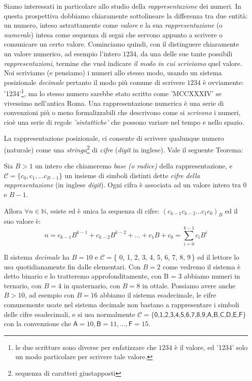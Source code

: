 Siamo interessati in particolare allo studio della \emph{rappresentazione} dei
numeri. In questa prospettiva dobbiamo chiaramente sottolineare la differenza
tra due entità: un numero, inteso astrattamente come \emph{valore} e la sua
\emph{rappresentazione} (o \emph{numerale}) intesa come sequenza di segni che
servono appunto a scrivere o comunicare un certo valore. Cominciamo quindi,
 con il distinguere chiaramente un valore
numerico, ad esempio l'intero $1234$, da una delle sue tante possibili
\emph{rappresentazioni}, termine che vuol indicare \emph{il modo in cui
scriviamo} quel valore. Noi scriviamo (e pensiamo) i numeri allo stesso modo,
usando un sistema posizionale \emph{decimale} pertanto il modo più comune di
scrivere $1234$ è ovviamente: \textsf{'1234'}\footnote{le due scritture sono
diverse per enfatizzare che $1234$ è il valore, ed \textsf{'1234'} solo un modo
particolare per scrivere tale valore.}, ma lo stesso numero sarebbe stato
scritto come \textsf{'MCCXXXIV'} se vivessimo nell'antica Roma. Una
rappresentazione numerica è una serie di convenzioni più o meno formalizzabili
che descrivono come si \emph{scrivono} i numeri, cioè una serie di regole
\emph{'sintattiche'} che possono variare nel tempo e nello spazio.

La rappresentazione posizionale, ci consente di scrivere qualunque numero
(naturale) come una \emph{stringa}\footnote{sequenza di caratteri giustapposti}
di \emph{cifre} (\emph{digit} in inglese). Vale il seguente Teorema:




\begin{thm} Sia $B>1$ un
intero che chiameremo \emph{base (o radice)} della rap\-presentazione, e
$\mathcal{C} = \{ c_0, c_1, \ldots c_{B-1} \}$ un insieme di simboli distinti
dette \emph{cifre della rappresentazione} (in inglese \emph{digit}). Ogni cifra
è associata ad un valore intero tra $0$ e $B-1$.\bigskip

Allora $\forall n \in \mathbb{N}$, esiste ed è unica la sequenza di cifre:
$(c_{k-1}c_{k-2} \ldots c_1c_0)_B$ ed il suo valore è:
\begin{equation}\label{eq:pos} 
n = c_{k-1}B^{k-1}+c_{k-2}B^{k-2}+\ldots+c_1B+c_0 = \sum_{i=0}^{k-1} c_iB^i
\end{equation} \end{thm} %

Il sistema \emph{decimale} ha $B = 10$ e $\mathcal{C} = $\{\textsf{ 0, 1, 2, 3,
4, 5, 6, 7, 8, 9}\,\} ed il lettore lo usa quotidianamente fin dalle
elementari.  Con $B =
2$ come vedremo il sistema è detto binario e lo tratteremo approfonditamente,
con B = 3 abbiamo numeri in ternario, con $B = 4$ in quaternario, con $B = 8$
in ottale. Possiamo avere anche $B > 10$, ad esempio con $B = 16$ abbiamo il
sistema esadecimale, le cifre comunemente usate nel sistema decimale non
bastano a rappresentare i simboli delle cifre esadecimali, e si usa normalmente
$\mathcal{C} = \{ \textsf{0,1,2,3,4,5,6,7,8,9,A,B,C,D,E,F} \}$ con la
convenzione che $\textsf{A} = 10, \textsf{B} = 11, \ldots, \textsf{F} = 15$.


